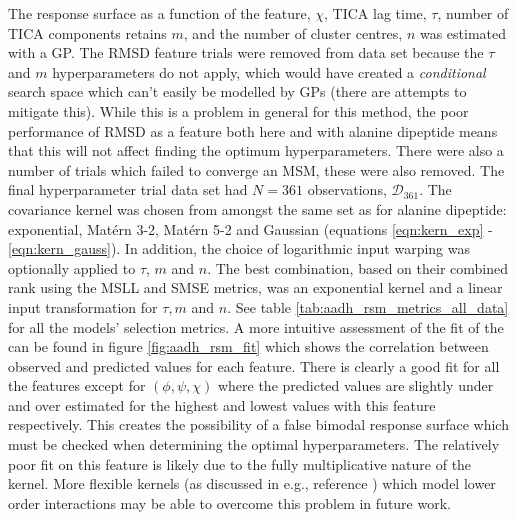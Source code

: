 The response surface as a function of the feature, $\chi$, TICA lag time, $\tau$, number of TICA components retains $m$, and the number of cluster centres, $n$ was estimated with a GP. The RMSD feature trials were removed from data set because the $\tau$ and $m$ hyperparameters do not apply, which would have created a \emph{conditional} search space\cite{bergstraAlgorithmsHyperParameterOptimizationa} which  can't easily be modelled by GPs (there are attempts to mitigate this\cite{swerskyRaidersLostArchitecture2014}). While this is a problem in general for this method, the poor performance of RMSD as a feature both here and with alanine dipeptide means that this will not affect finding the optimum hyperparameters. There were also a number of trials which failed to converge an MSM, these were also removed. The final hyperparameter trial data set had $N=361$ observations, $\mathcal{D}_{361}$. 
The covariance kernel was chosen from amongst the same set as for alanine dipeptide: exponential, Mat\'{e}rn 3-2, Mat\'{e}rn 5-2 and  Gaussian (equations \ref{eqn:kern_exp} - \ref{eqn:kern_gauss}). In addition, the choice of logarithmic  input warping was optionally applied to $\tau$, $m$ and $n$. The best combination, based on their combined rank using the MSLL and SMSE metrics, was an exponential kernel and a linear input transformation for $\tau, m$ and $n$. See table \ref{tab:aadh_rsm_metrics_all_data} for  all the models' selection metrics. A more intuitive assessment of the fit of the can be found in figure  \ref{fig:aadh_rsm_fit} which shows the correlation between observed and predicted values for each feature. There is clearly a good fit for all the features except for $(\phi, \psi, \chi)$ where the predicted values are slightly under and over estimated for the highest and lowest values with this feature respectively. This creates the possibility of a false bimodal response surface which must be checked when determining the optimal hyperparameters.  The relatively poor fit on this feature is likely due to the fully multiplicative nature of the kernel. More flexible kernels (as discussed in e.g., reference \cite{duvenaud2011additive}) which model lower order interactions may be able to overcome this problem in future work. 

